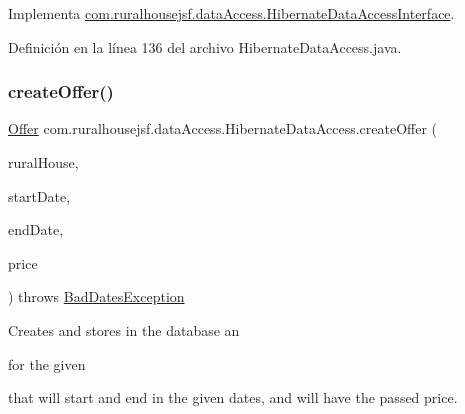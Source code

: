 Implementa \mbox{\hyperlink{interfacecom_1_1ruralhousejsf_1_1data_access_1_1_hibernate_data_access_interface_a4671ad8ff75ef8a9195974dbdcd95e7f}{com.\+ruralhousejsf.\+data\+Access.\+Hibernate\+Data\+Access\+Interface}}.



Definición en la línea 136 del archivo Hibernate\+Data\+Access.\+java.

\mbox{\label{classcom_1_1ruralhousejsf_1_1data_access_1_1_hibernate_data_access_a332f591a06df13d36814ff215008987b}} 
\subsubsection{\texorpdfstring{createOffer()}{createOffer()}\hspace{0.1cm}{\footnotesize\ttfamily [1/2]}}
{\footnotesize\ttfamily \mbox{\hyperlink{classcom_1_1ruralhousejsf_1_1domain_1_1_offer}{Offer}} com.\+ruralhousejsf.\+data\+Access.\+Hibernate\+Data\+Access.\+create\+Offer (\begin{DoxyParamCaption}\item[{\mbox{\hyperlink{classcom_1_1ruralhousejsf_1_1domain_1_1_rural_house}{Rural\+House}}}]{rural\+House,  }\item[{Local\+Date}]{start\+Date,  }\item[{Local\+Date}]{end\+Date,  }\item[{double}]{price }\end{DoxyParamCaption}) throws \mbox{\hyperlink{classcom_1_1ruralhousejsf_1_1exceptions_1_1_bad_dates_exception}{Bad\+Dates\+Exception}}}

Creates and stores in the database an
\begin{DoxyCode}{0}
\end{DoxyCode}
 for the given
\begin{DoxyCode}{0}
\end{DoxyCode}
 that will start and end in the given dates, and will have the passed price.


